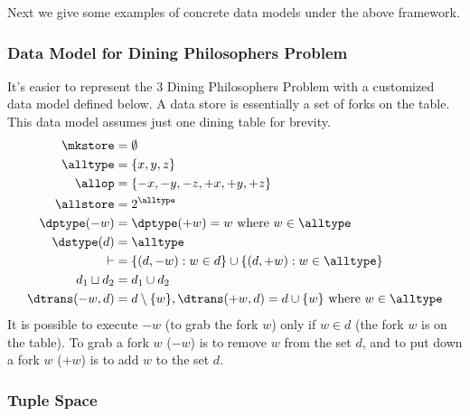 Next we give some examples of concrete data models under the above framework.

\subsubsection*{Data Model for Dining Philosophers Problem}

It's easier to represent the 3 Dining Philosophers Problem with
a customized data model defined below.
A data store is essentially a set of forks on the table. 
This data model assumes just one dining table for brevity.
\begin{align*}
  \mkstore &= \emptyset
\\
  \alltype &= \{ x,y,z \}
\\
  \allop &= \{ -x, -y, -z, +x, +y, +z \}
\\
  \allstore &= 2^\alltype
\\
  \dptype(-w) & =\dptype(+w)=w \text{ where } w\in\alltype
\\
  \dstype(d) &= \alltype
\\
  \vdash &= \{(d,-w):w\in d\}\cup\{(d,+w):w\in\alltype\}
\\
  d_1\sqcup d_2 & = d_1\cup d_2
\\
  \dtrans(-w,d) &= d\setminus\{w\},
  \dtrans(+w,d) = d\cup\{w\}
  \text{ where } w\in\alltype
\end{align*}
It is possible to execute $-w$ (to grab the fork $w$) only if $w\in d$ (the fork $w$ is on the table).
To grab a fork $w$ ($-w$) is to remove $w$ from the set $d$, and to put down a fork $w$ ($+w$) is to add $w$ to the set $d$.

\subsubsection*{Tuple Space}

